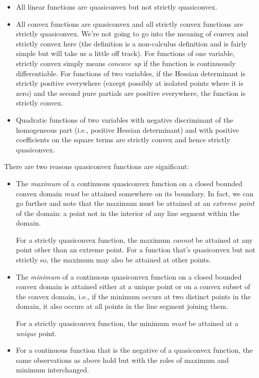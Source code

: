\documentclass[10pt]{amsart}
\begin{document}
\begin{itemize}
\item All linear functions are quasiconvex but not strictly quasiconvex.
\item All convex functions are quasiconvex and all strictly convex
  functions are strictly quasiconvex. We're not going to go into the
  meaning of convex and strictly convex here (the definition is a
  non-calculus definition and is fairly simple but will take us a
  little off track). For functions of one variable, strictly convex
  simply means {\em concave up} if the function is continuously
  differentiable. For functions of two variables, if the Hessian
  determinant is strictly positive everywhere (except possibly at
  isolated points where it is zero) and the second pure
  partials are positive everywhere, the function is strictly convex.
\item Quadratic functions of two variables with negative discriminant
  of the homogeneous part (i.e., positive Hessian determinant) 
  and with positive coefficients on the square terms are
  strictly convex and hence strictly quasiconvex.
\end{itemize}

There are two reasons quasiconvex functions are significant:

\begin{itemize}
\item The {\em maximum} of a continuous quasiconvex function on a
  closed bounded convex domain {\em must} be attained somewhere on its
  boundary. In fact, we can go further and note that the maximum must
  be attained at an {\em extreme point} of the domain: a point not in
  the interior of any line segment within the domain.

  For a strictly quasiconvex function, the maximum {\em cannot} be
  attained at any point other than an extreme point. For a function
  that's quasiconvex but not strictly so, the maximum may also be
  attained at other points.
\item The {\em minimum} of a continuous quasiconvex function on a
  closed bounded convex domain is attained either at a unique point or
  on a convex subset of the convex domain, i.e., if the minimum occurs
  at two distinct points in the domain, it also occurs at all points
  in the line segment joining them.

  For a strictly quasiconvex function, the minimum {\em must} be
  attained at a {\em unique} point.
\item For a continuous function that is the negative of a quasiconvex
  function, the same observations as above hold but with the roles of
  maximum and minimum interchanged.
\end{itemize}
\end{document}
